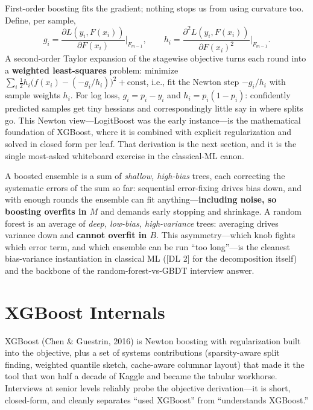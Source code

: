 First-order boosting fits the gradient; nothing stops us from using curvature too. Define, per sample,
\begin{equation}
g_i = \frac{\partial L(y_i, F(x_i))}{\partial F(x_i)}\bigg|_{F_{m-1}}, \qquad
h_i = \frac{\partial^2 L(y_i, F(x_i))}{\partial F(x_i)^2}\bigg|_{F_{m-1}}.
\end{equation}
A second-order Taylor expansion of the stagewise objective turns each round into a \textbf{weighted least-squares} problem: minimize $\sum_i \tfrac{1}{2} h_i \big(f(x_i) - (-g_i/h_i)\big)^2 + \text{const}$, i.e., fit the Newton step $-g_i/h_i$ with sample weights $h_i$. For log loss, $g_i = p_i - y_i$ and $h_i = p_i(1-p_i)$: confidently predicted samples get tiny hessians and correspondingly little say in where splits go. This Newton view---LogitBoost was the early instance---is the mathematical foundation of XGBoost, where it is combined with explicit regularization and solved in closed form per leaf. That derivation is the next section, and it is the single most-asked whiteboard exercise in the classical-ML canon.

\begin{keyinsight}
A boosted ensemble is a sum of \textit{shallow, high-bias} trees, each correcting the systematic errors of the sum so far: sequential error-fixing drives bias down, and with enough rounds the ensemble can fit anything---\textbf{including noise, so boosting overfits in $M$} and demands early stopping and shrinkage. A random forest is an average of \textit{deep, low-bias, high-variance} trees: averaging drives variance down and \textbf{cannot overfit in $B$}. This asymmetry---which knob fights which error term, and which ensemble can be run ``too long''---is the cleanest bias-variance instantiation in classical ML ([DL 2] for the decomposition itself) and the backbone of the random-forest-vs-GBDT interview answer.
\end{keyinsight}

\section{XGBoost Internals}
\label{cml:sec:xgboost}

XGBoost (Chen \& Guestrin, 2016) is Newton boosting with regularization built into the objective, plus a set of systems contributions (sparsity-aware split finding, weighted quantile sketch, cache-aware columnar layout) that made it the tool that won half a decade of Kaggle and became the tabular workhorse. Interviews at senior levels reliably probe the objective derivation---it is short, closed-form, and cleanly separates ``used XGBoost'' from ``understands XGBoost.''

